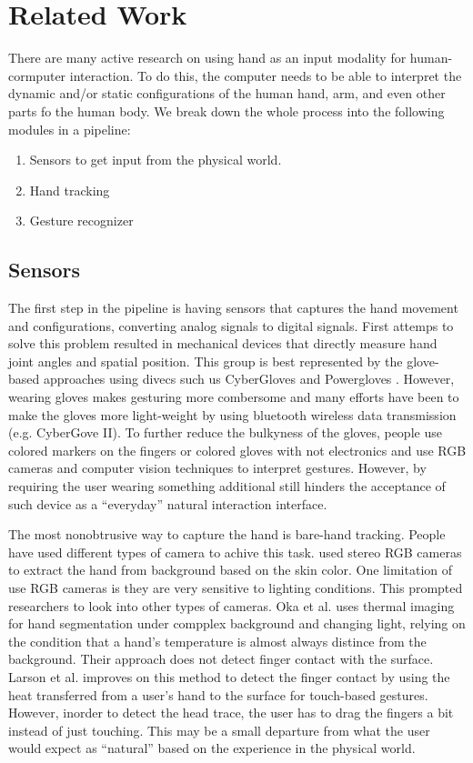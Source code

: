 \section{Related Work}
There are many active research on using hand as an input modality for
human-cormputer interaction. To do this, the computer needs to be able to
interpret the dynamic and/or static configurations of the human hand, arm, and
even other parts fo the human body. We break down the whole process into the
following modules in a pipeline:

\begin{enumerate}
  \item Sensors to get input from the physical world.
  \item Hand tracking 
  \item Gesture recognizer
\end{enumerate}

\subsection{Sensors}
The first step in the pipeline is having sensors that captures the hand movement
and configurations, converting analog signals to digital signals. First attemps
to solve this problem resulted in mechanical devices that directly measure hand
joint angles and spatial position. This group is best represented by the
glove-based approaches using divecs such us CyberGloves \cite{fels09} and
Powergloves \cite{kadous02}. However, wearing gloves makes gesturing more
combersome and many efforts have been to make the gloves more light-weight by
using bluetooth wireless data transmission (e.g. CyberGove II). To further
reduce the bulkyness of the gloves, people use colored markers on the fingers
\cite{mistry09} or colored gloves with not electronics \cite{Wang09} and use RGB
cameras and computer vision techniques to interpret gestures. However, by
requiring the user wearing something additional still hinders the acceptance of
such device as a ``everyday'' natural interaction interface. 

The most nonobtrusive way to capture the hand is bare-hand tracking. People have
used different types of camera to achive this task. \cite{Shin04} used stereo RGB
cameras to extract the hand from background based on the skin color. One
limitation of use RGB cameras is they are very sensitive to lighting conditions.
This prompted researchers to look into other types of cameras. Oka et al. 
\cite{Oka02} uses thermal imaging for hand segmentation under compplex
background and changing light, relying on the condition that a hand's
temperature is almost always distince from the background. Their approach does
not detect finger contact with the surface. Larson et al. \cite{larson11}
improves on this method to detect the finger contact by using
the heat transferred from a user's hand to the surface for touch-based gestures.
However, inorder to detect the head trace, the user has to drag the fingers a
bit instead of just touching. This may be a small departure from what the user
would expect as ``natural'' based on the experience in the physical world.

